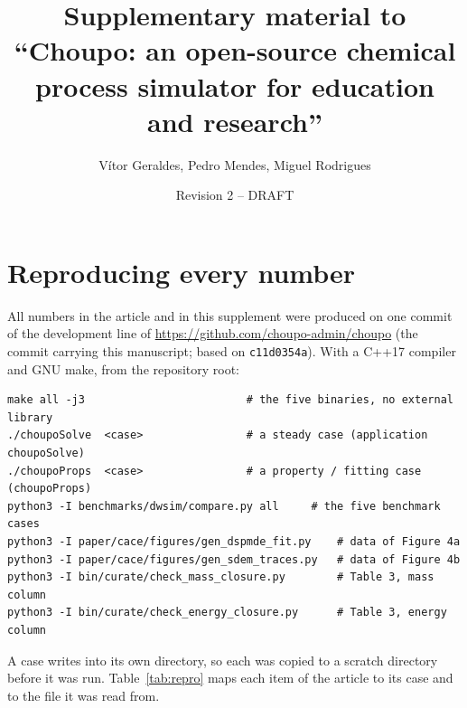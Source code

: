\documentclass[11pt]{article}
\title{Supplementary material to ``Choupo: an open-source chemical process
simulator for education and research''}
\author{Vítor Geraldes, Pedro Mendes, Miguel Rodrigues}
\date{Revision 2 -- DRAFT}
\newcommand{\code}[1]{\nolinkurl{#1}}
\begin{document}
\maketitle

\section{Reproducing every number}
\label{s:repro}

All numbers in the article and in this supplement were produced on one
commit of the development line of \url{https://github.com/choupo-admin/choupo}
(the commit carrying this manuscript; based on \code{c11d0354a}).  With a
C++17 compiler and GNU make, from the repository root:

\begin{lstlisting}
make all -j3                         # the five binaries, no external library
./choupoSolve  <case>                # a steady case (application choupoSolve)
./choupoProps  <case>                # a property / fitting case (choupoProps)
python3 -I benchmarks/dwsim/compare.py all     # the five benchmark cases
python3 -I paper/cace/figures/gen_dspmde_fit.py    # data of Figure 4a
python3 -I paper/cace/figures/gen_sdem_traces.py   # data of Figure 4b
python3 -I bin/curate/check_mass_closure.py        # Table 3, mass column
python3 -I bin/curate/check_energy_closure.py      # Table 3, energy column
\end{lstlisting}

A case writes into its own directory, so each was copied to a scratch
directory before it was run.  Table~\ref{tab:repro} maps each item of the
article to its case and to the file it was read from.
\end{document}

